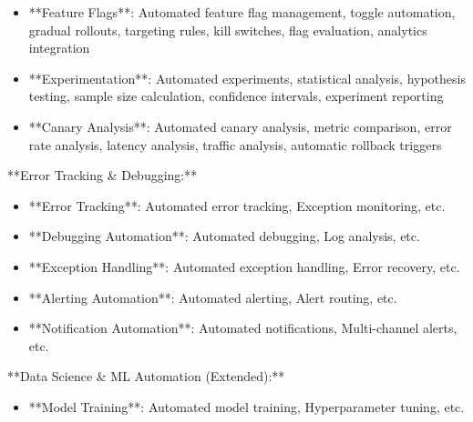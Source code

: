 \documentclass[11pt,a4paper]{article}
\begin{document}
\begin{itemize}
\item **Feature Flags**: Automated feature flag management, toggle automation, gradual rollouts, targeting rules, kill switches, flag evaluation, analytics integration
\end{itemize}

\begin{itemize}
\item **Experimentation**: Automated experiments, statistical analysis, hypothesis testing, sample size calculation, confidence intervals, experiment reporting
\end{itemize}

\begin{itemize}
\item **Canary Analysis**: Automated canary analysis, metric comparison, error rate analysis, latency analysis, traffic analysis, automatic rollback triggers
\end{itemize}

**Error Tracking \& Debugging:**

\begin{itemize}
\item **Error Tracking**: Automated error tracking, Exception monitoring, etc.
\end{itemize}

\begin{itemize}
\item **Debugging Automation**: Automated debugging, Log analysis, etc.
\end{itemize}

\begin{itemize}
\item **Exception Handling**: Automated exception handling, Error recovery, etc.
\end{itemize}

\begin{itemize}
\item **Alerting Automation**: Automated alerting, Alert routing, etc.
\end{itemize}

\begin{itemize}
\item **Notification Automation**: Automated notifications, Multi-channel alerts, etc.
\end{itemize}

**Data Science \& ML Automation (Extended):**

\begin{itemize}
\item **Model Training**: Automated model training, Hyperparameter tuning, etc.
\end{itemize}
\end{document}
